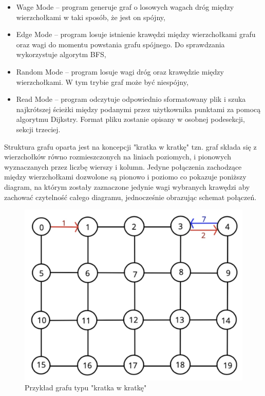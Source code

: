 \documentclass[10pt, a4paper]{report}
\begin{document}
\begin{itemize}
    \item Wage Mode – program generuje graf o losowych wagach dróg między wierzchołkami w taki sposób, że jest on spójny,
    \item Edge Mode – program losuje istnienie krawędzi między wierzchołkami grafu oraz wagi do momentu powstania 
    grafu spójnego. Do sprawdzania wykorzystuje algorytm BFS,
    \item Random Mode – program losuje wagi dróg oraz krawędzie między wierzchołkami. W tym trybie graf może być niespójny,
    \item Read Mode -- program odczytuje odpowiednio sformatowany plik i szuka najkrótszej ścieżki
    między podanymi przez użytkownika punktami za pomocą algorytmu Dijkstry. Format pliku zostanie opisany w osobnej podesekcji, sekcji trzeciej.
\end{itemize}
Struktura grafu oparta jest na koncepcji "kratka w kratkę" tzn. graf składa się z wierzchołków równo rozmieszczonych na liniach poziomych, 
i pionowych wyznaczanych przez liczbę wierszy i kolumn. Jedyne połączenia zachodzące między wierzchołkami dozwolone są  pionowo i poziomo co pokazuje poniższy diagram, na którym zostały zaznaczone jedynie wagi wybranych krawędzi aby zachować czytelność całego diagramu, jednocześnie obrazując schemat połączeń.
\begin{figure}[h]
    \begin{center}
        \includegraphics[scale=0.15]{graf}
        \caption{Przykład grafu typu "kratka w kratkę"}
    \end{center}
\end{figure}
\newpage
\end{document}
